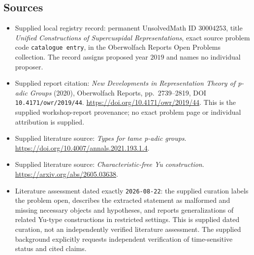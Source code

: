 \documentclass[11pt]{article}
\begin{document}
\subsection{Sources}
\begin{itemize}
\item Supplied local registry record: permanent UnsolvedMath ID \(30004253\), title \emph{Unified Constructions of Supercuspidal Representations}, exact source problem code \texttt{catalogue entry}, in the Oberwolfach Reports Open Problems collection. The record assigns proposed year \(2019\) and names no individual proposer.
\item Supplied report citation: \emph{New Developments in Representation Theory of p-adic Groups} (2020), Oberwolfach Reports, pp.\ 2739--2819, DOI \texttt{10.4171/owr/2019/44}. \url{https://doi.org/10.4171/owr/2019/44}. This is the supplied workshop-report provenance; no exact problem page or individual attribution is supplied.
\item Supplied literature source: \emph{Types for tame p-adic groups}. \url{https://doi.org/10.4007/annals.2021.193.1.4}.
\item Supplied literature source: \emph{Characteristic-free Yu construction}. \url{https://arxiv.org/abs/2605.03638}.
\item Literature assessment dated exactly \texttt{2026-08-22}: the supplied curation labels the problem open, describes the extracted statement as malformed and missing necessary objects and hypotheses, and reports generalizations of related Yu-type constructions in restricted settings. This is supplied dated curation, not an independently verified literature assessment. The supplied background explicitly requests independent verification of time-sensitive status and cited claims.
\end{itemize}
\end{document}
